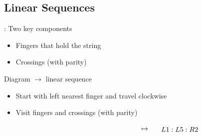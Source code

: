 \subsection{Linear Sequences}
\begin{frame}{\secname: \subsecname}
Two key components
\begin{itemize}[<+(1)->]
    \item Fingers that hold the string
    \item Crossings (with parity)
\end{itemize}

\pause Diagram $\to$ linear sequence

\begin{itemize}[<+(1)->]
    \item Start with left nearest finger and travel clockwise
    \item Visit fingers and crossings (with parity)
\end{itemize}

\pause
\def\svgwidth{0.6\columnwidth}
$$\begin{tikzpicture}
    \node at(0,0){};
    \node[shift={(120pt,0)}] at(0,0){$\mapsto$};
    \node[shift={(170pt,0)}] at(0,0){$L1:L5:R2$};
\end{tikzpicture}$$
\end{frame}


